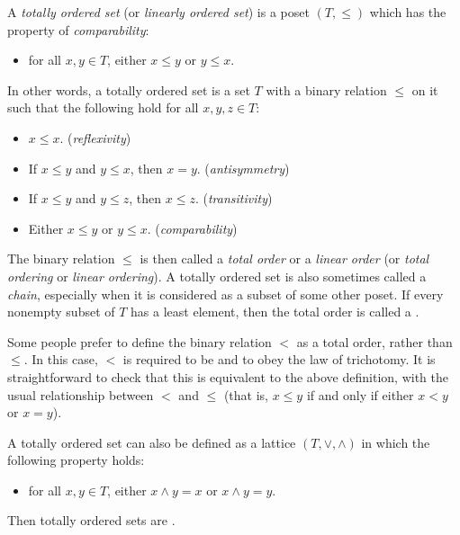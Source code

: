 \documentclass[12pt]{article}
\begin{document}

A \emph{totally ordered set} (or \emph{linearly ordered set}) is a poset $(T,\leq)$ which has the property of \emph{comparability}:
\begin{itemize}
\item for all $x,y\in T$, either $x\leq y$ or $y \leq x$.
\end{itemize}
In other words, a totally ordered set is a set $T$ with a binary relation $\leq$ on it
such that the following hold for all $x,y,z\in T$:
\begin{itemize}
\item $x\leq x$. ({\it reflexivity})
\item If $x\leq y$ and $y\leq x$, then $x=y$. ({\it antisymmetry})
\item If $x\leq y$ and $y\leq z$, then $x\leq z$. ({\it transitivity})
\item Either $x\leq y$ or $y \leq x$. ({\it comparability})
\end{itemize}

The binary relation $\leq$ is then called a \emph{total order} or a \emph{linear order} (or \emph{total ordering} or \emph{linear ordering}).
A totally ordered set is also sometimes called a \emph{chain}, especially when it is considered as a subset of some other poset.
If every nonempty subset of $T$ has a least element, then the total order is called a .

Some people prefer to define the binary relation $<$ as a total order, rather than $\leq$.
In this case, $<$ is required to be  and to obey the law of trichotomy.
It is straightforward to check that this is equivalent to the above definition, with the usual relationship between $<$ and $\leq$
(that is, $x\leq y$ if and only if either $x<y$ or $x=y$).

A totally ordered set can also be defined as a lattice $(T,\lor,\land)$ in which the following property holds:
\begin{itemize}
\item for all $x,y\in T$, either $x\land y=x$ or $x\land y=y$.
\end{itemize}
Then totally ordered sets are .
\end{document}
